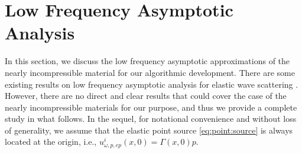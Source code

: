\documentclass[a4paper,11pt]{article}
\newcommand{\mO}{\mathcal{O}}
\newtheorem{corollary}{Corollary}[section]
\theoremstyle{remark}
\newtheorem{remark}{Remark}[section]
\theoremstyle{definition}
\numberwithin{equation}{section}
\begin{document}


\section{Low Frequency Asymptotic Analysis}\label{sec:analysis:lowfre}
In this section, we discuss the low frequency asymptotic approximations of the nearly incompressible material for our algorithmic development.
There are some existing results on low frequency asymptotic analysis for elastic wave scattering \cite{DR}. However,  there are no direct and clear results that could cover the case of the nearly incompressible materials for our purpose, and thus we provide a complete study in what follows. In the sequel, for notational convenience and without loss of generality, we assume that the elastic point source \eqref{eq:point:source} is always located at the origin, i.e.,
$u_{\omega,p,ep}^{i}(x,0)=\Gamma(x,0)p$.
\end{document}
